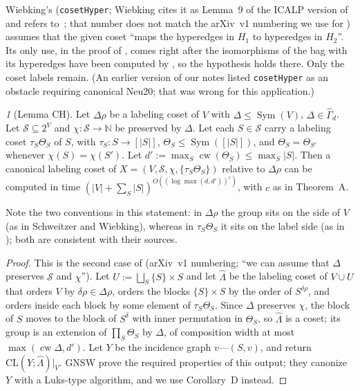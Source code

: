 \documentclass[11pt]{article}
\theoremstyle{plain}
\theoremstyle{definition}
\theoremstyle{remark}
\theoremstyle{named}
\newtheorem*{named}{}
\theoremstyle{namedrm}
\newcommand{\status}[1]{\par\smallskip\noindent
  \fbox{\parbox{\dimexpr\linewidth-2\fboxsep-2\fboxrule\relax}{\small\textbf{Status.} #1}}\par\smallskip}
\newcommand{\Sym}{\operatorname{Sym}}
\newcommand{\cw}{\operatorname{cw}}
\newcommand{\Gd}{\widehat{\Gamma}_d}
\newcommand{\cS}{\mathcal{S}}
\begin{document}
Wiebking's \cite[Lemma~34]{Wie20} (\texttt{cosetHyper}; Wiebking cites it as Lemma~9 of the ICALP version
of~\cite{GNSW} and refers to~\cite{Neu19}; that number does not match the arXiv~v1 numbering we use for
\cite{GNSW})
assumes that the given coset ``maps the hyperedges in $H_1$ to hyperedges in $H_2$''. Its only use, in the
proof of \cite[Thm.~35]{Wie20}, comes right after the isomorphisms of the bag with its hyperedges have been
computed by \cite[Lemma~33]{Wie20}, so the hypothesis holds there. Only the coset labels remain. (An
earlier version of our notes listed \texttt{cosetHyper} as an obstacle requiring canonical Neu20; that was
wrong for this application.)

\begin{named}[Lemma CH]
Let $\Delta\rho$ be a labeling coset of $V$ with $\Delta\le\Sym(V)$, $\Delta\in\Gd$. Let $\cS\subseteq2^V$ and $\chi\colon\cS\to\mathbb N$
be preserved by $\Delta$. Let each $S\in\cS$ carry a labeling coset $\tau_S\Theta_S$ of $S$, with
$\tau_S\colon S\to[|S|]$, $\Theta_S\le\Sym([|S|])$, and $\Theta_S=\Theta_{S'}$ whenever $\chi(S)=\chi(S')$. Let
$d':=\max_S\cw(\Theta_S)\le\max_S|S|$. Then a canonical labeling coset of $X=(V,\cS,\chi,\{\tau_S\Theta_S\})$ relative
to $\Delta\rho$ can be computed in time $(|V|+\sum_S|S|)^{O((\log\max(d,d'))^c)}$, with $c$ as in Theorem~A.
\end{named}
Note the two conventions in this statement: in $\Delta\rho$ the group sits on the side of $V$ (as in
Schweitzer and Wiebking), whereas in $\tau_S\Theta_S$ it sits on the label side (as in \cite{GNSW}); both are
consistent with their sources.
\begin{proof}
This is the second case of \cite[Lemma~23]{GNSW} (arXiv~v1 numbering; ``we can assume that $\Delta$
preserves $\mathcal S$ and $\chi$''). Let $U:=\bigsqcup_S\{S\}\times S$ and let $\hat\Lambda$ be the labeling coset of
$V\cup U$ that orders $V$ by $\delta\rho\in\Delta\rho$, orders the blocks $\{S\}\times S$ by the order of $S^{\delta\rho}$, and
orders inside each block by some element of $\tau_S\Theta_S$. Since $\Delta$ preserves $\chi$, the block of $S$ moves to
the block of $S^\delta$ with inner permutation in $\Theta_S$, so $\hat\Lambda$ is a coset; its group is an extension of
$\prod_S\Theta_S$ by $\Delta$, of composition width at most $\max(\cw\Delta,d')$. Let $Y$ be the incidence graph
$v$---$(S,v)$, and return $\mathrm{CL}(Y;\hat\Lambda)|_V$. GNSW prove the required properties of this output; they
canonize $Y$ with a Luks-type algorithm, and we use Corollary~D instead.
\end{proof}
\status{Proof modulo Corollary~D and \cite[Lemma~23]{GNSW}.}
\end{document}
